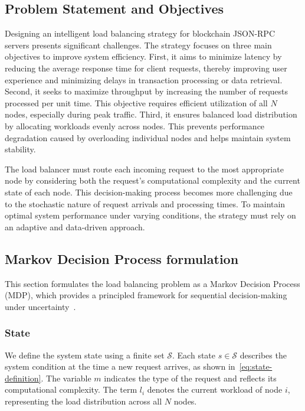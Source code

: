 \documentclass[lnbip]{svmultln}
\begin{document}
\subsection{Problem Statement and Objectives}\label{s:3.2}

Designing an intelligent load balancing strategy for blockchain JSON-RPC servers presents significant challenges. The strategy focuses on three main objectives to improve system efficiency. First, it aims to minimize latency by reducing the average response time for client requests, thereby improving user experience and minimizing delays in transaction processing or data retrieval. Second, it seeks to maximize throughput by increasing the number of requests processed per unit time. This objective requires efficient utilization of all $N$ nodes, especially during peak traffic. Third, it ensures balanced load distribution by allocating workloads evenly across nodes. This prevents performance degradation caused by overloading individual nodes and helps maintain system stability.


The load balancer must route each incoming request to the most appropriate node by considering both the request's computational complexity and the current state of each node. This decision-making process becomes more challenging due to the stochastic nature of request arrivals and processing times. To maintain optimal system performance under varying conditions, the strategy must rely on an adaptive and data-driven approach.


\subsection{Markov Decision Process formulation}\label{s:3.3}

This section formulates the load balancing problem as a Markov Decision Process (MDP), which provides a principled framework for sequential decision-making under uncertainty~\cite{puterman1990}.

\subsubsection{State}\label{s:3.3.1}
We define the system state using a finite set $\mathcal{S}$. Each state $s \in \mathcal{S}$ describes the system condition at the time a new request arrives, as shown in~\eqref{eq:state-definition}. The variable $m$ indicates the type of the request and reflects its computational complexity. The term $l_i$ denotes the current workload of node $i$, representing the load distribution across all $N$ nodes.
\end{document}
